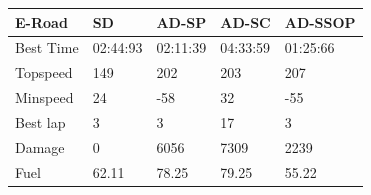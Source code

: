 \documentclass[runningheads,a4paper]{llncs}
\begin{document}
\begin{table}[h!]
{\begin{tabular}{ |p{3.5cm}|p{2cm}|p{2cm}|p{2 cm}|p{2 cm}|}
				\hline
				{ \color{blue}\textbf{E-Road} }&
				{ \color{red}\textbf{SD}}&  
				{ \color{red} \textbf{AD-SP} } &
				{ \color{red} \textbf{AD-SC} } &
				{ \color{red} \textbf{AD-SSOP} }
				\\
				\hline
				Best Time & 02:44:93  & 02:11:39 & 04:33:59 & 01:25:66 
				\\
				\hline
				Topspeed & 149  & 202 & 203 & 207 
				\\
				\hline
				Minspeed & 24  & -58 & 32& -55 
				\\
				\hline 
				Best lap & 3 & 3 & 17 & 3
				\\
				\hline
				Damage & 0 & 6056 & 7309 & 2239 
				\\
				\hline 
				Fuel & 62.11 & 78.25 & 79.25 &  55.22 
				

\end{tabular}}
\end{table}
\end{document}
